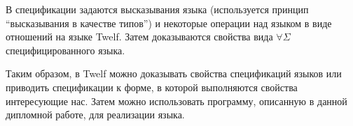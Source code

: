 В спецификации задаются высказывания языка (используется принцип ``высказывания в качестве типов''\cite{harper:1993}) и некоторые операции над языком в виде отношений на языке Twelf. Затем доказываются свойства вида  $\forall\Sigma$ специфицированного языка.

Таким образом, в Twelf можно доказывать свойства спецификаций языков или приводить спецификации к форме, в которой выполняются свойства интересующие нас. Затем можно использовать программу, описанную в данной дипломной работе, для реализации языка.






